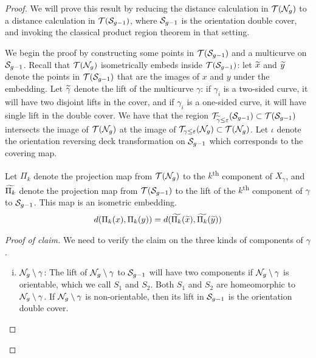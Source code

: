 \documentclass[12pt, reqno]{amsart}
\begin{document}
\begin{proof}
  We will prove this result by reducing the distance calculation in $\mathcal{T}(\mathcal{N}_g)$ to a distance calculation in $\mathcal{T}(\mathcal{S}_{g-1})$, where $\mathcal{S}_{g-1}$ is the orientation double cover, and invoking the classical product region theorem in that setting.

  We begin the proof by constructing some points in $\mathcal{T}(\mathcal{S}_{g-1})$ and a multicurve on $\mathcal{S}_{g-1}$.
  Recall that $\mathcal{T}(\mathcal{N}_g)$ isometrically embeds inside $\mathcal{T}(\mathcal{S}_{g-1})$: let $\widetilde{x}$ and $\widetilde{y}$ denote the points in $\mathcal{T}(\mathcal{S}_{g-1})$ that are the images of $x$ and $y$ under the embedding.
  Let $\widetilde{\gamma}$ denote the lift of the multicurve $\gamma$: if $\gamma_i$ is a two-sided curve, it will have two disjoint lifts in the cover, and if $\gamma_i$ is a one-sided curve, it will have single lift in the double cover.
  We have that the region $\mathcal{T}_{\widetilde{\gamma} \leq \varepsilon}(\mathcal{S}_{g-1}) \subset \mathcal{T}(\mathcal{S}_{g-1})$ intersects the image of $\mathcal{T}(\mathcal{N}_g)$ at the image of $\mathcal{T}_{\gamma \leq \varepsilon}(\mathcal{N}_g) \subset \mathcal{T}(\mathcal{N}_g)$.
  Let $\iota$ denote the orientation reversing deck transformation on $\mathcal{S}_{g-1}$ which corresponds to the covering map.

  \begin{claim*}
    Let $\Pi_k$ denote the projection map from $\mathcal{T}(\mathcal{N}_g)$ to the $k$\textsuperscript{th} component of $X_\gamma$, and $\widetilde{\Pi_k}$ denote the projection map from $\mathcal{T}(\mathcal{S}_{g-1})$ to the lift of the $k$\textsuperscript{th} component of $\gamma$ to $\mathcal{S}_{g-1}$.
    This map is an isometric embedding.
    \begin{align*}
      d(\Pi_k(x), \Pi_k(y)) = d(\widetilde{\Pi_k}(\widetilde{x}), \widetilde{\Pi_k}(\widetilde{y}))
    \end{align*}
  \end{claim*}

  \begin{proof}[Proof of claim]
  We need to verify the claim on the three kinds of components of $\gamma$.
  \begin{enumerate}[(i)]
  \item $\mathcal{N}_g \setminus \gamma$: The lift of $\mathcal{N}_g \setminus \gamma$ to $\mathcal{S}_{g-1}$ will have two components if $\mathcal{N}_g \setminus \gamma$ is orientable, which we call $S_1$ and $S_2$. Both $S_1$ and $S_2$ are homeomorphic to $\mathcal{N}_g \setminus \gamma$.
    If $\mathcal{N}_g \setminus \gamma$ is non-orientable, then its lift in $\mathcal{S}_{g-1}$ is the orientation double cover.


\end{enumerate}
\end{proof}
\end{proof}
\end{document}
